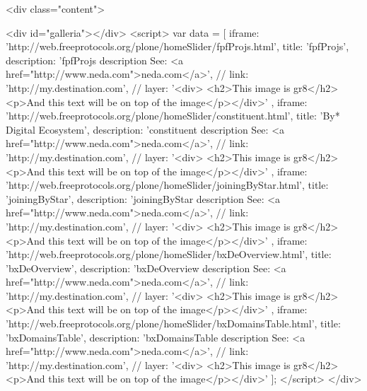 \begin{rawhtml}
    <div class="content">

        <div id="galleria"></div> 
	<script>
	  var data = [
	  {
          iframe: 'http://web.freeprotocols.org/plone/homeSlider/fpfProjs.html',
          title: 'fpfProjs',
          description: 'fpfProjs description See: <a href="http://www.neda.com">neda.com</a>',
          // link: 'http://my.destination.com',
          // layer: '<div> <h2>This image is gr8</h2><p>And this text will be on top of the image</p></div>'
	  }
            ,
	  {
          iframe: 'http://web.freeprotocols.org/plone/homeSlider/constituent.html',
          title: 'By* Digital Ecosystem',
          description: 'constituent description See: <a href="http://www.neda.com">neda.com</a>',
          // link: 'http://my.destination.com',
          // layer: '<div> <h2>This image is gr8</h2><p>And this text will be on top of the image</p></div>'
	  }
            ,
	  {
          iframe: 'http://web.freeprotocols.org/plone/homeSlider/joiningByStar.html',
          title: 'joiningByStar',
          description: 'joiningByStar description See: <a href="http://www.neda.com">neda.com</a>',
          // link: 'http://my.destination.com',
          // layer: '<div> <h2>This image is gr8</h2><p>And this text will be on top of the image</p></div>'
	  }
            ,
	  {
          iframe: 'http://web.freeprotocols.org/plone/homeSlider/bxDeOverview.html',
          title: 'bxDeOverview',
          description: 'bxDeOverview description See: <a href="http://www.neda.com">neda.com</a>',
          // link: 'http://my.destination.com',
          // layer: '<div> <h2>This image is gr8</h2><p>And this text will be on top of the image</p></div>'
	  }
            ,
	  {
          iframe: 'http://web.freeprotocols.org/plone/homeSlider/bxDomainsTable.html',
          title: 'bxDomainsTable',
          description: 'bxDomainsTable description See: <a href="http://www.neda.com">neda.com</a>',
          // link: 'http://my.destination.com',
          // layer: '<div> <h2>This image is gr8</h2><p>And this text will be on top of the image</p></div>'
	  }
	  ];
       	</script>
    </div>
\end{rawhtml}
